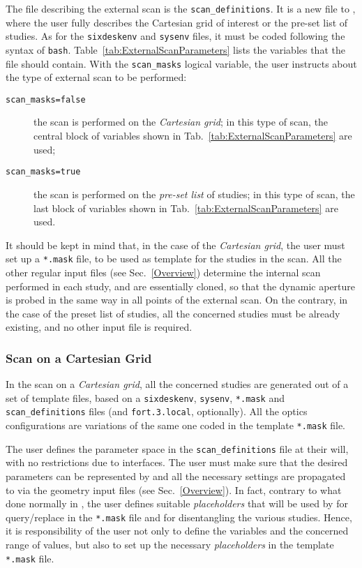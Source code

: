 The file describing the external scan is the \texttt{scan\_definitions}.
It is a new file to \SIXDESK{}, where the user fully describes the Cartesian
grid of interest or the pre-set list of studies. As for the
\texttt{sixdeskenv} and \texttt{sysenv} files, it must be coded
following the syntax of \texttt{bash}.
Table~\ref{tab:ExternalScanParameters}
lists the variables that the file should contain.
With the \texttt{scan\_masks} logical variable, the user instructs
\SIXDESK{} about the type of external scan to be performed:
\begin{description}
\item[\texttt{scan\_masks=false}] the scan is performed on the
  \emph{Cartesian grid}; in this type of scan, the central
  block of variables shown in Tab.~\ref{tab:ExternalScanParameters}
  are used;
\item[\texttt{scan\_masks=true}] the scan is performed on the
  \emph{pre-set list} of studies; in this type of scan, the last
  block of variables shown in Tab.~\ref{tab:ExternalScanParameters}
  are used.
\end{description}

It should be kept in mind that, in the case of the \emph{Cartesian grid},
the user must set up a \texttt{*.mask} file, to be used as template for
the studies in the scan. All the other regular input files
(see Sec.~\ref{Overview}) determine the
internal scan performed in each study, and are essentially cloned,
so that the dynamic aperture is probed in the same way
in all points of the external scan. On the contrary,
in the case of the preset list of studies, all the concerned
studies must be already existing, and no other input file is
required.

\subsubsection{Scan on a Cartesian Grid}
In the scan on a \emph{Cartesian grid}, all the concerned studies
are generated out of a set of template files, based on a
\texttt{sixdeskenv}, \texttt{sysenv}, \texttt{*.mask} and
\texttt{scan\_definitions} files (and \texttt{fort.3.local}, optionally).
All the optics configurations are variations of the same one coded
in the template \texttt{*.mask} file.

The user defines the parameter space in the \texttt{scan\_definitions}
file at their will, with no restrictions due to interfaces. The user must
make sure that the desired parameters can be represented by \MADX{}
and all the necessary settings are propagated to \SIXTRACK{} via
the geometry input files (see Sec.~\ref{Overview}).
In fact, contrary to what done normally in
\SIXDESK{}, the user defines suitable \emph{placeholders} that will be
used by \SIXDESK{} for query/replace in the \texttt{*.mask} file and
for disentangling the various studies. Hence, it is responsibility of the
user not only to define the variables and the concerned range of values,
but also to set up the necessary \emph{placeholders}
in the template \texttt{*.mask} file.

